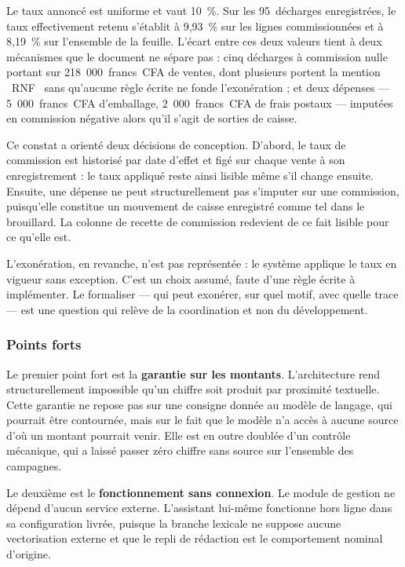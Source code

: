 Le taux annoncé est uniforme et vaut 10~\%. Sur les 95~décharges enregistrées, le taux effectivement retenu s'établit à 9,93~\% sur les lignes commissionnées et à 8,19~\% sur l'ensemble de la feuille. L'écart entre ces deux valeurs tient à deux mécanismes que le document ne sépare pas : cinq décharges à commission nulle portant sur 218~000~francs~CFA de ventes, dont plusieurs portent la mention \guillemotleft~RNF~\guillemotright{} sans qu'aucune règle écrite ne fonde l'exonération ; et deux dépenses --- 5~000~francs~CFA d'emballage, 2~000~francs~CFA de frais postaux --- imputées en commission négative alors qu'il s'agit de sorties de caisse.

Ce constat a orienté deux décisions de conception. D'abord, le taux de commission est historisé par date d'effet et figé sur chaque vente à son enregistrement : le taux appliqué reste ainsi lisible même s'il change ensuite. Ensuite, une dépense ne peut structurellement pas s'imputer sur une commission, puisqu'elle constitue un mouvement de caisse enregistré comme tel dans le brouillard. La colonne de recette de commission redevient de ce fait lisible pour ce qu'elle est.

L'exonération, en revanche, n'est pas représentée : le système applique le taux en vigueur sans exception. C'est un choix assumé, faute d'une règle écrite à implémenter. Le formaliser --- qui peut exonérer, sur quel motif, avec quelle trace --- est une question qui relève de la coordination et non du développement.

\subsubsection{Points forts}

Le premier point fort est la \textbf{garantie sur les montants}. L'architecture rend structurellement impossible qu'un chiffre soit produit par proximité textuelle. Cette garantie ne repose pas sur une consigne donnée au modèle de langage, qui pourrait être contournée, mais sur le fait que le modèle n'a accès à aucune source d'où un montant pourrait venir. Elle est en outre doublée d'un contrôle mécanique, qui a laissé passer zéro chiffre sans source sur l'ensemble des campagnes.

Le deuxième est le \textbf{fonctionnement sans connexion}. Le module de gestion ne dépend d'aucun service externe. L'assistant lui-même fonctionne hors ligne dans sa configuration livrée, puisque la branche lexicale ne suppose aucune vectorisation externe et que le repli de rédaction est le comportement nominal d'origine.

